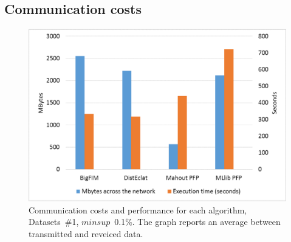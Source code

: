 \documentclass[preprint,review,12pt]{elsarticle}
\begin{document}
\subsection{Communication costs}
\label{communication_costs}

\begin{figure}[!t]
\begin{center}
\includegraphics[width=5in]{comm_costs.eps}
\caption{Communication costs and performance for each algorithm,
Datasets~\#1, $minsup$~0.1\%.
The graph reports an average between transmitted and reveiced data.}
\label{comm_costs}
\end{center}
\end{figure}

%
\end{document}
